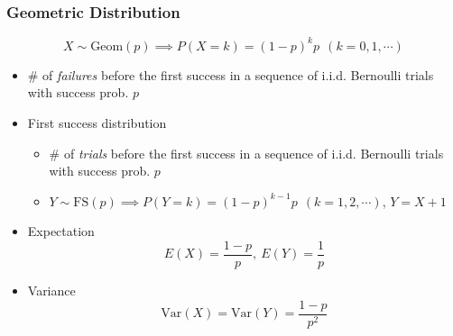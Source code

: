 \subsubsection*{Geometric Distribution}
\begin{equation}
    X\sim\text{Geom}(p)\implies P(X=k)=(1-p)^kp~~(k=0,1,\cdots)
\end{equation}
\begin{itemize}
    \item \# of \textit{failures} before the first success in a sequence of i.i.d. Bernoulli trials with success prob. $p$
    \item First success distribution
    \begin{itemize}
        \item \# of \textit{trials} before the first success in a sequence of i.i.d. Bernoulli trials with success prob. $p$
        \item $Y\sim\text{FS}(p)\implies P(Y=k)=(1-p)^{k-1}p~~(k=1,2,\cdots)$, $Y=X+1$
    \end{itemize}
    \item Expectation
    \begin{equation}
        E(X)=\frac{1-p}{p},~E(Y)=\frac{1}{p}
    \end{equation}
    \item Variance
    \begin{equation}
        \text{Var}(X)=\text{Var}(Y)=\frac{1-p}{p^2}
    \end{equation}
\end{itemize}

